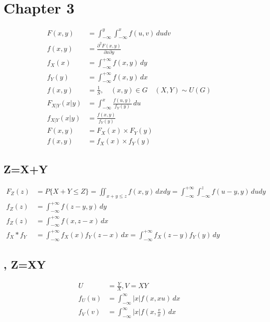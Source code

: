 \documentclass[12pt]{article}
\begin{document}
\section{Chapter 3}

\begin{align}
    F(x,y) &= \int_{-\infty}^{y}\int_{-\infty}^{x} f(u,v) \,dudv \\
    f(x,y) &= \frac{\partial^2 F(x,y)}{\partial x \partial y}\\
    f_X(x) &= \int_{-\infty}^{+\infty} f(x,y) \, dy \\
    f_Y(y) &= \int_{-\infty}^{+\infty} f(x,y) \, dx \\
    f(x,y) &= \frac{1}{S}, \quad (x,y)\in G \quad (X,Y)\sim U(G)\\
    F_{X|Y}(x|y) &= \int_{-\infty}^{x} \frac{f(u,y)}{f_Y(y)} \,du \\
    f_{X|Y}(x|y) &= \frac{f(x,y)}{f_Y(y)}\\
    F(x,y) &= F_X(x) \times F_Y(y)\\
    f(x,y) &= f_X(x) \times f_Y(y)
\end{align}

\subsection{Z=X+Y}

\begin{align}
    F_Z(z) &= P\{X+Y\leqslant Z\} = \iint _{x+y\leqslant z} f(x,y) \, dxdy =\int_{-\infty}^{+\infty} \int_{-\infty}^{z} f(u-y,y)  \,dudy \\
    f_Z(z) &= \int_{-\infty}^{+\infty}  f(z-y,y) \,dy\\
    f_Z(z) &= \int_{-\infty}^{+\infty}  f(x,z-x) \,dx\\
    f_X*f_Y &= \int_{-\infty}^{+\infty}  f_X(x)f_Y(z-x) \,dx =\int_{-\infty}^{+\infty}  f_X(z-y)f_Y(y) \,dy 
\end{align}

\subsection{, Z=XY}

\begin{align}
    U &= \frac{Y}{X}, V=XY\\
    f_U(u) &= \int_{-\infty}^{\infty} \left\lvert x \right\rvert f(x,xu)  \,dx\\
    f_V(v) &= \int_{-\infty}^{\infty} \left\lvert x \right\rvert f(x,\frac{v}{x})  \,dx
\end{align}
\end{document}
